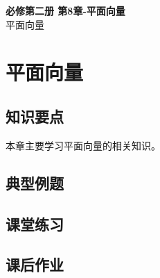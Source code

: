 \documentclass[12pt,a4paper]{article}
\begin{document}
\begin{center}
\LARGE\textbf{必修第二册 第8章-平面向量} \\[0.5em]
\large 平面向量
\end{center}

\tableofcontents
\newpage

\section{平面向量}

\subsection{知识要点}
本章主要学习平面向量的相关知识。

\subsection{典型例题}

\subsection{课堂练习}

\subsection{课后作业}
\end{document}

